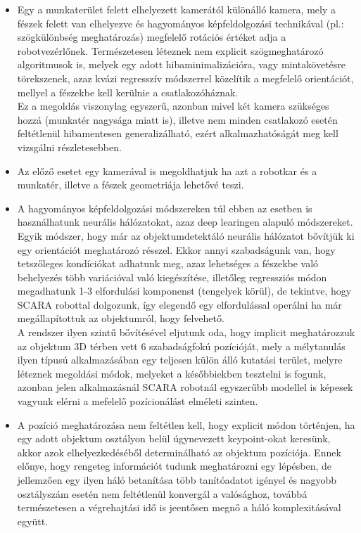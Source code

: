 \documentclass{article}
\begin{document}
\begin{itemize}
  \item Egy a munkaterület felett elhelyezett kamerától különálló kamera, mely a fészek felett van elhelyezve
  és hagyományos képfeldolgozási technikával (pl.: szögkülönbség meghatározás) megfelelő rotációs értéket adja a 
  robotvezérlőnek. Természetesen léteznek nem explicit szögmeghatározó algoritmusok is, melyek egy adott hibaminimalizációra,
  vagy mintakövetésre törekszenek, azaz kvázi regresszív módszerrel közelítik a megfelelő orientációt, mellyel a fészekbe
  kell kerülnie a csatlakozóháznak.\\
  Ez a megoldás viszonylag egyszerű, azonban mivel két kamera szükséges hozzá (munkatér nagysága miatt is), illetve 
  nem minden csatlakozó esetén feltétlenül hibamentesen generalizálható, ezért alkalmazhatóságát meg kell vizsgálni részletesebben.
  \item Az előző esetet egy kamerával is megoldhatjuk ha azt a robotkar és a munkatér, illetve a fészek geometriája
  lehetővé teszi.
  \item A hagyományos képfeldolgozási módszereken túl ebben az esetben is használhatunk neurális hálózatokat, azaz
  deep learingen alapuló módszereket.\\
  Egyik módszer, hogy már az objektumdetektáló neurális hálózatot bővítjük ki egy orientációt meghatározó résszel. 
  Ekkor annyi szabadságunk van, hogy tetszőleges kondíciókat adhatunk meg, azaz lehetséges a fészekbe való behelyezés
  több variációval való kiegészítése, illetőleg regressziós módon megadhatunk 1-3 elfordulási komponenst (tengelyek körül),
  de tekintve, hogy SCARA robottal dolgozunk, így elegendő egy elfordulással operálni ha már megállapítottuk az 
  objektumról, hogy felvehető.\\
  A rendszer ilyen szintű bővítésével eljutunk oda, hogy implicit meghatározzuk az objektum 3D térben vett 6 szabadságfokú
  pozícióját, mely a mélytanulás ilyen típusú alkalmazásában egy teljesen külön álló kutatási terület, melyre 
  léteznek megoldási módok, melyeket a későbbiekben tesztelni is fogunk, azonban jelen alkalmazásnál SCARA robotnál 
  egyszerűbb modellel is képesek vagyunk elérni a mefelelő pozícionálást elméleti szinten.
  \item A pozíció meghatározása nem feltétlen kell, hogy explicit módon történjen, ha egy adott objektum osztályon 
  belül úgynevezett keypoint-okat keresünk, akkor azok elhelyezkedéséből determinálható az objektum pozíciója.
  Ennek előnye, hogy rengeteg információt tudunk meghatározni egy lépésben, de jellemzően egy ilyen háló betanítása
  több tanítóadatot igényel és nagyobb osztályszám esetén nem feltétlenül konvergál a valósághoz, továbbá természetesen
  a végrehajtási idő is jeentősen megnő a háló komplexitásával együtt.
\end{itemize}
\end{document}

